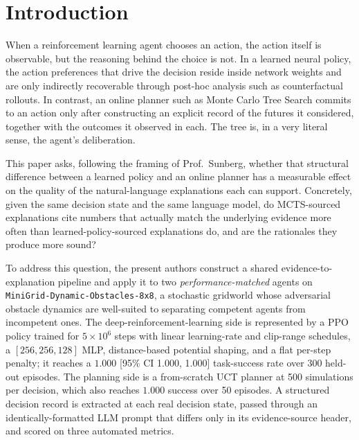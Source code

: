 \documentclass[conference]{IEEEtran}
\begin{document}
\section{Introduction}
When a reinforcement learning agent chooses an action, the action
itself is observable, but the reasoning behind the choice is not. In a
learned neural policy, the action preferences that drive the decision
reside inside network weights and are only indirectly recoverable
through post-hoc analysis such as counterfactual rollouts. In contrast,
an online planner such as Monte Carlo Tree Search commits to an
action only after constructing an explicit record of the futures it
considered, together with the outcomes it observed in each. The tree
is, in a very literal sense, the agent's deliberation.

This paper asks, following the framing of Prof.\ Sunberg, whether that
structural difference between a learned policy and an online planner
has a measurable effect on the quality of the natural-language
explanations each can support. Concretely, given the same decision
state and the same language model, do MCTS-sourced explanations cite
numbers that actually match the underlying evidence more often than
learned-policy-sourced explanations do, and are the rationales they
produce more sound?

To address this question, the present authors construct a shared
evidence-to-explanation pipeline and apply it to two
\emph{performance-matched} agents on
\texttt{MiniGrid-Dynamic-Obstacles-8x8}, a stochastic gridworld whose
adversarial obstacle dynamics are well-suited to separating competent
agents from incompetent ones. The deep-reinforcement-learning side is
represented by a PPO policy trained for $5\times 10^{6}$ steps with
linear learning-rate and clip-range schedules, a $[256,256,128]$ MLP,
distance-based potential shaping, and a flat per-step penalty; it
reaches a $1.000$ [95\% CI 1.000, 1.000] task-success rate over 300
held-out episodes. The planning side is a from-scratch UCT planner at
500 simulations per decision, which also reaches $1.000$ success over
50 episodes. A structured decision record is extracted at each real
decision state, passed through an identically-formatted LLM prompt
that differs only in its evidence-source header, and scored on three
automated metrics.
\end{document}
